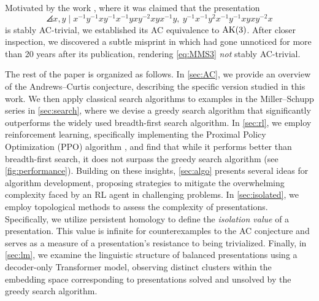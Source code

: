 \medskip\noindent
Motivated by the work \cite{MMS}, where it was claimed that the presentation
\begin{equation}\label{eq:MMS3}
	\angles{ x, y \mid
		x^{-1}y^{-1}xy^{-1}x^{-1}yxy^{-2}xyx^{-1}y, \
		y^{-1}x^{-1}y^2x^{-1}y^{-1}xyxy^{-2}x }
\end{equation}
is stably AC-trivial, we established its AC equivalence to $\text{AK}(3)$.
After closer inspection, we discovered a subtle misprint in \cite[p.X]{MMS}\anibal{@SB: Please add page} which had gone unnoticed for more than 20 years after its publication, rendering \eqref{eq:MMS3} \textit{not} stably AC-trivial.


\medskip The rest of the paper is organized as follows. In \autoref{sec:AC}, we provide an overview of the Andrews--Curtis conjecture, describing the specific version studied in this work. We then apply classical search algorithms to examples in the Miller--Schupp series in \autoref{sec:search}, where we devise a greedy search algorithm that significantly outperforms the widely used breadth-first search algorithm. In \autoref{sec:rl}, we employ reinforcement learning, specifically implementing the Proximal Policy Optimization (PPO) algorithm \cite{schulman2017proximal}, and find that while it performs better than breadth-first search, it does not surpass the greedy search algorithm (see \autoref{fig:performance}). Building on these insights, \autoref{sec:algo} presents several ideas for algorithm development, proposing strategies to mitigate the overwhelming complexity faced by an RL agent in challenging problems. In \autoref{sec:isolated}, we employ topological methods to assess the complexity of presentations. Specifically, we utilize persistent homology to define the \textit{isolation value} of a presentation. This value is infinite for counterexamples to the AC conjecture and serves as a measure of a presentation's resistance to being trivialized. Finally, in \autoref{sec:lm}, we examine the linguistic structure of balanced presentations using a decoder-only Transformer model, observing distinct clusters within the embedding space corresponding to presentations solved and unsolved by the greedy search algorithm.

